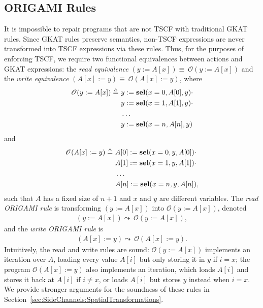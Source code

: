 \subsection{ORIGAMI Rules}
\label{sec:SideChannels:OrigamiRules}
It is impossible to repair programs that are not TSCF with traditional GKAT rules. Since GKAT rules preserve semantics, non-TSCF expressions are never transformed into TSCF expressions via these rules. 
Thus, for the purposes of enforcing TSCF, we require two functional equivalences between actions and GKAT expressions: the \emph{read equivalence} $(y:=A[x])\equiv\ \mathscr{O}(y:=A[x])$ and the \emph{write equivalence} $(A[x]:=y)\equiv\ \mathscr{O}(A[x]:=y)$, where 
\begin{align*}
    \mathscr{O}(y:=A[x])\triangleq\  
    &y:=\textbf{sel}(x=0,A[0],y)\cdot \\
    &y:=\textbf{sel}(x=1,A[1],y)\cdot \\
    &\ldots\\
    &y:=\textbf{sel}(x=n,A[n],y)
\end{align*} and 
\begin{align*}
    \mathscr{O}(A[x]:=y)\triangleq\  
    &A[0]:=\textbf{sel}(x=0,y,A[0])\cdot \\
    &A[1]:=\textbf{sel}(x=1,y,A[1])\cdot \\
    &\ldots\\
    &A[n]:=\textbf{sel}(x=n,y,A[n]),
\end{align*}
such that $A$ has a fixed size of $n+1$ and $x$ and $y$ are different variables. The \emph{read ORIGAMI rule} is transforming $(y:=A[x])$ into $\mathscr{O}(y:=A[x])$, denoted 
\begin{align}
    (y:=A[x])\leadsto\ \mathscr{O}(y:=A[x]),
\end{align}
and the \emph{write ORIGAMI rule} is 
\begin{align}
    (A[x]:=y)\leadsto\ \mathscr{O}(A[x]:=y).
\end{align}
Intuitively, the read and write rules are sound: $\mathscr{O}(y:=A[x])$ implements an iteration over $A$, loading every value $A[i]$ but only storing it in $y$ if $i=x$; the program $\mathscr{O}(A[x]:=y)$ also implements an iteration, which loads $A[i]$ and stores it back at $A[i]$ if $i\neq x$, or loads $A[i]$ but stores $y$ instead when $i=x$. We provide stronger arguments for the soundness of these rules in Section~\ref{sec:SideChannels:SpatialTransformations}.

